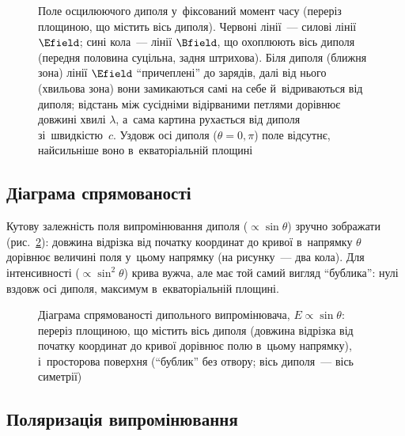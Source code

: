 \begin{figure}[h!]\centering
	\caption{Поле осцилюючого диполя у~фіксований момент часу (переріз площиною, що містить вісь диполя).
	Червоні лінії~--- силові лінії $\Efield$; сині кола~--- лінії $\Bfield$, що охоплюють вісь диполя
	(передня половина суцільна, задня штрихова). Біля диполя (ближня зона) лінії $\Efield$ \enquote{причеплені}
	до зарядів, далі від нього (хвильова зона) вони замикаються самі на себе й~відриваються від диполя;
	відстань між сусідніми відірваними петлями дорівнює довжині хвилі $\lambda$, а~сама картина
	рухається від диполя зі~швидкістю~$c$. Уздовж осі диполя ($\theta=0,\pi$) поле відсутнє,
	найсильніше воно в~екваторіальній площині\label{pic:DipoleRadiationSnapshot}}
\end{figure}


\subsection*{Діаграма спрямованості}


Кутову залежність поля випромінювання диполя ($\propto\sin\theta$) зручно
зображати  (рис.~\ref{pic:PolarPattern}): довжина
відрізка від початку координат до кривої в~напрямку $\theta$ дорівнює величині поля у~цьому
напрямку (на рисунку~--- два кола). Для інтенсивності ($\propto\sin^2\theta$) крива вужча, але
має той самий вигляд \enquote{бублика}: нулі вздовж осі диполя, максимум в~екваторіальній площині.

\begin{figure}[h!]\centering
	\caption{Діаграма спрямованості дипольного випромінювача, $E\propto\sin\theta$: переріз площиною, що містить вісь диполя
	(довжина відрізка від початку координат до кривої дорівнює полю в~цьому напрямку), і~просторова
	поверхня (\enquote{бублик} без отвору; вісь диполя~--- вісь симетрії)\label{pic:PolarPattern}}
\end{figure}



\subsection*{Поляризація випромінювання}



